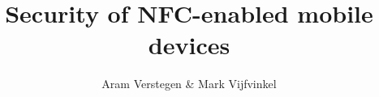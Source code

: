 \documentclass[runningheads,a4paper]{llncs}
\begin{document}
\newcommand{\mytitle}{Security of NFC-enabled mobile devices}
\newcommand{\myauthor}{Aram Verstegen \& Mark Vijfvinkel}
\newcommand{\mycourse}{Research \& Development - Research 1}
\author{\myauthor}
\title{\mytitle}
\maketitle



\newpage


\setcounter{page}{1}








\newpage


\cleardoublepage

\newpage



\end{document}
